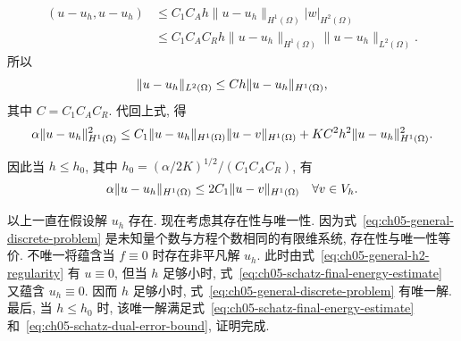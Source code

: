\begin{Proof}
\[\begin{aligned}
(u-u_h,u-u_h)
&\leq C_1C_Ah\|u-u_h\|_{H^1(\Omega)}|w|_{H^2(\Omega)}\\
&\leq C_1C_AC_Rh\|u-u_h\|_{H^1(\Omega)}\|u-u_h\|_{L^2(\Omega)}.
\end{aligned}
\]
所以
\begin{equation}
\MathBookFormulaID{formula-ch05-schatz-dual-error-bound}
\label{eq:ch05-schatz-dual-error-bound}
\|u-u_h\|_{L^2(\Omega)}\leq Ch\|u-u_h\|_{H^1(\Omega)},
\end{equation}
其中 $C=C_1C_AC_R$. 代回上式, 得
\[
\MathBookFormulaID{formula-ch05-schatz-absorption-bound}
\alpha\|u-u_h\|_{H^1(\Omega)}^2
\leq C_1\|u-u_h\|_{H^1(\Omega)}\|u-v\|_{H^1(\Omega)}
+KC^2h^2\|u-u_h\|_{H^1(\Omega)}^2.
\]

因此当 $h\leq h_0$, 其中 $h_0=(\alpha/2K)^{1/2}/(C_1C_AC_R)$, 有
\begin{equation}
\MathBookFormulaID{formula-ch05-schatz-final-energy-estimate}
\label{eq:ch05-schatz-final-energy-estimate}
\alpha\|u-u_h\|_{H^1(\Omega)}
\leq2C_1\|u-v\|_{H^1(\Omega)}
\quad\forall v\in V_h.
\end{equation}

以上一直在假设解 $u_h$ 存在. 现在考虑其存在性与唯一性. 因为式~\eqref{eq:ch05-general-discrete-problem} 是未知量个数与方程个数相同的有限维系统, 存在性与唯一性等价. 不唯一将蕴含当 $f\equiv0$ 时存在非平凡解 $u_h$. 此时由式~\eqref{eq:ch05-general-h2-regularity} 有 $u\equiv0$, 但当 $h$ 足够小时, 式~\eqref{eq:ch05-schatz-final-energy-estimate} 又蕴含 $u_h\equiv0$. 因而 $h$ 足够小时, 式~\eqref{eq:ch05-general-discrete-problem} 有唯一解. 最后, 当 $h\leq h_0$ 时, 该唯一解满足式~\eqref{eq:ch05-schatz-final-energy-estimate} 和~\eqref{eq:ch05-schatz-dual-error-bound}, 证明完成.
\end{Proof}
